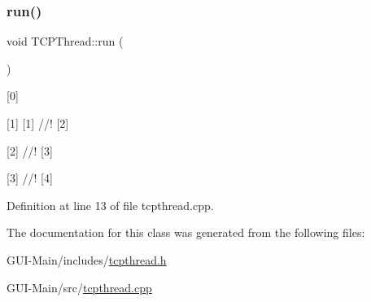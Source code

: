 \subsubsection{\texorpdfstring{run()}{run()}}
{\footnotesize\ttfamily void T\+C\+P\+Thread\+::run (\begin{DoxyParamCaption}{ }\end{DoxyParamCaption})\hspace{0.3cm}{\ttfamily [override]}}



\mbox{[}0\mbox{]} 

\mbox{[}1\mbox{]} \mbox{[}1\mbox{]} //! \mbox{[}2\mbox{]}

\mbox{[}2\mbox{]} //! \mbox{[}3\mbox{]}

\mbox{[}3\mbox{]} //! \mbox{[}4\mbox{]} 

Definition at line 13 of file tcpthread.\+cpp.



The documentation for this class was generated from the following files\+:\begin{DoxyCompactItemize}
\item 
G\+U\+I-\/\+Main/includes/\hyperlink{tcpthread_8h}{tcpthread.\+h}\item 
G\+U\+I-\/\+Main/src/\hyperlink{tcpthread_8cpp}{tcpthread.\+cpp}\end{DoxyCompactItemize}
